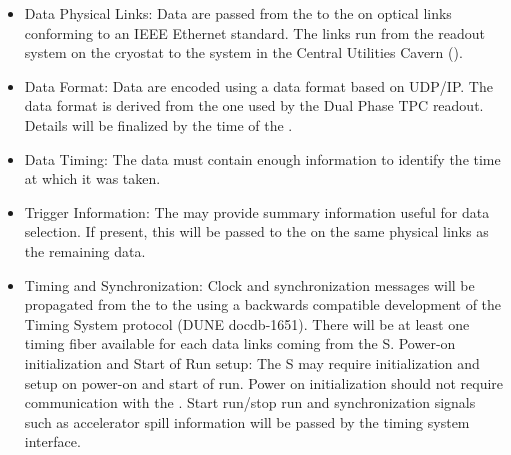 \begin{itemize}

\item Data Physical Links: Data are passed from the  to the  on optical links conforming to an IEEE Ethernet standard. The links run from the  readout system on the cryostat to the  system in the Central Utilities Cavern ().

\item Data Format: Data are encoded using a data format based on UDP/IP. The data format is derived from the one used by the Dual Phase TPC readout. Details will be finalized by the time of the  .

\item Data Timing: The data must contain enough information to identify the time  at which it was taken.

\item Trigger Information: The  may provide summary information useful for data selection. If present, this will be passed to the  on the same physical links as the remaining data.

\item Timing and Synchronization: Clock and synchronization messages will be propagated from the  to the  using a backwards compatible development of the  Timing System protocol (DUNE docdb-1651). There will be at least one timing fiber available for each data links coming from the S. Power-on initialization and Start of Run setup:  The S may require initialization and setup on power-on and start of run. Power on initialization should not require communication with the . Start run/stop run and synchronization signals such as accelerator spill information will be passed by the timing system interface.

\end{itemize}


